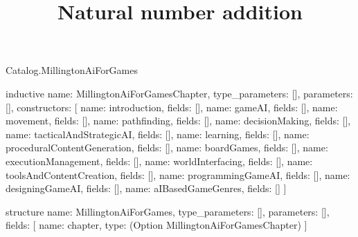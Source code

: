 \begin{lexlean}{Catalog.MillingtonAiForGames}
\title{Natural number addition}
\begin{semanticmodule}
inductive{
  name: MillingtonAiForGamesChapter,
  type_parameters: [],
  parameters: [],
  constructors: [
    {name: introduction, fields: []},
    {name: gameAI, fields: []},
    {name: movement, fields: []},
    {name: pathfinding, fields: []},
    {name: decisionMaking, fields: []},
    {name: tacticalAndStrategicAI, fields: []},
    {name: learning, fields: []},
    {name: proceduralContentGeneration, fields: []},
    {name: boardGames, fields: []},
    {name: executionManagement, fields: []},
    {name: worldInterfacing, fields: []},
    {name: toolsAndContentCreation, fields: []},
    {name: programmingGameAI, fields: []},
    {name: designingGameAI, fields: []},
    {name: aIBasedGameGenres, fields: []}
  ]
}

structure{
  name: MillingtonAiForGames,
  type_parameters: [],
  parameters: [],
  fields: [
    {name: chapter, type: (Option MillingtonAiForGamesChapter)}
  ]
}
\end{semanticmodule}
\end{lexlean}
